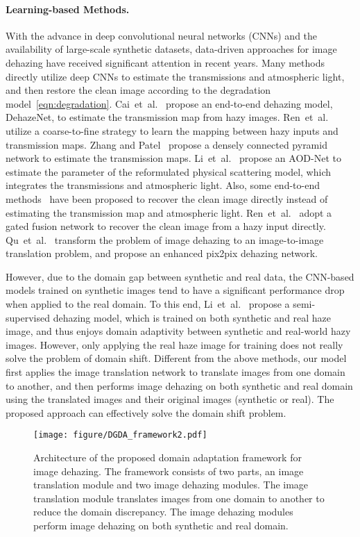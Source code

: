 \documentclass[10pt,twocolumn,letterpaper]{article}
\def\etal{et~al.\xspace}
\begin{document}
\paragraph{Learning-based Methods.}
With the advance in deep convolutional neural networks (CNNs) and the availability of large-scale synthetic datasets, data-driven approaches for image dehazing have received significant attention in recent years.
Many methods~\cite{Cai2016DehazeNet, ren2016single, Zhang_2018_CVPR, li2017aod} directly utilize deep CNNs to estimate the transmissions and atmospheric light, and then restore the clean image according to the degradation model~\eqref{eqn:degradation}.
Cai~\etal~\cite{Cai2016DehazeNet} propose an end-to-end dehazing model, DehazeNet, to estimate the transmission map from hazy images.
Ren~\etal~\cite{ren2016single} utilize a coarse-to-fine strategy to learn the mapping between hazy inputs and transmission maps.
Zhang and Patel~\cite{Zhang_2018_CVPR} propose a densely connected pyramid network to estimate the transmission maps.
Li~\etal~\cite{li2017aod} propose an AOD-Net to estimate the parameter of the reformulated physical scattering model, which integrates the transmissions and atmospheric light.
Also, some end-to-end methods~\cite{Ren_2018_CVPR, Li_2018_CVPR, qu2019enhanced} have been proposed to recover the clean image directly instead of estimating the transmission map and atmospheric light. 
Ren~\etal~\cite{Ren_2018_CVPR} adopt a gated fusion network to recover the clean image from a hazy input directly.
Qu~\etal~\cite{qu2019enhanced} transform the problem of image dehazing to an image-to-image translation problem, and propose an enhanced pix2pix dehazing network.


However, due to the domain gap between synthetic and real data, the CNN-based models trained on synthetic images tend to have a significant performance drop when applied to the real domain. 
To this end,  Li~\etal~\cite{li2019semi} propose a semi-supervised dehazing model, which is trained on both synthetic and real haze image, and thus enjoys domain adaptivity between synthetic and real-world hazy images. 
However, only applying the real haze image for training does not really solve the problem of domain shift. 
Different from the above methods, our model first applies the image translation network to translate images from one domain to another, and then performs image dehazing on both synthetic and real domain using the translated images and their original images (synthetic or real).
The proposed approach can effectively solve the domain shift problem.
\begin{figure*}[t]
\begin{center}
    \texttt{[image: figure/DGDA\_framework2.pdf]}
\end{center}
\vspace{-2mm}
\caption{Architecture of the proposed domain adaptation framework for image dehazing.
The framework consists of two parts, an image translation module and two image dehazing modules.
The image translation module translates images from one domain to another to reduce the domain discrepancy.
The image dehazing modules perform image dehazing on both synthetic and real domain.}
\label{fig:network}
\end{figure*}
\end{document}

